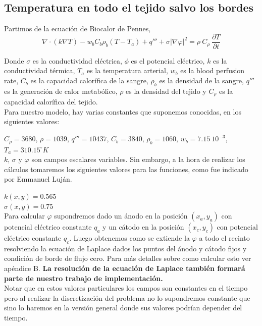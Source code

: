 \documentclass[a4paper]{article}
\begin{document}
\subsection{Temperatura en todo el tejido salvo los bordes}

Partimos de la ecuación de Biocalor de Pennes, 
$$\nabla \cdot (k \nabla T) - w_b C_b \rho_b (T-T_a) + q''' + \sigma |\nabla \varphi|^2 = \rho \ C_\rho \ \frac{\partial T}{\partial t}$$

Donde $\sigma$ es la conductividad eléctrica, $\phi$ es el potencial eléctrico, $k$ es la conductividad térmica, $T_a$ es la temperatura arterial, $w_b$ es la blood perfusion rate, $C_b$ es la capacidad calorífica de la sangre, $\rho_b$ es la densidad de la sangre, $q'''$ es la generación de calor metabólico, $\rho$ es la densidad del tejido y $C_\rho$ es la capacidad calorífica del tejido.\\

Para nuestro modelo, hay varias constantes que suponemos conocidas, en los siguientes valores:

$C_\rho= 3680$, $\rho= 1039$, $q'''= 10437$, $C_b= 3840$, $\rho_b= 1060$, $w_b=7.15 \ 10^{-3}$, $T_a = 310.15^\circ K$ \\

$k$, $\sigma$ y $\varphi$ son campos escalares variables. Sin embargo, a la hora de realizar los cálculos tomaremos los siguientes valores para las funciones,
como fue indicado por Emmanuel Luján. 

$k(x,y)=0.565$ \\
$\sigma(x,y)=0.75$ \\

Para calcular $\varphi$ supondremos dado un ánodo en la posición $(x_a, y_a)$ con potencial eléctrico 
constante $q_a$ y un cátodo en la posición $(x_c, y_c)$ con potencial eléctrico 
constante $q_c$. Luego obtenemos como se extiende la $\varphi$ a todo el recinto 
resolviendo la ecuación de Laplace dados los puntos del ánodo y cátodo fijos y 
condición de borde de flujo cero. Para más detalles sobre como calcular esto ver apéndice B.
\textbf{La resolución de la ecuación de Laplace también formará parte de nuestro trabajo de implementación.}\\

Notar que en estos valores particulares los campos son constantes en el tiempo pero al realizar la discretización del problema no lo supondremos constante que sino lo haremos en la versión general donde sus valores podrían depender del tiempo.
\end{document}
